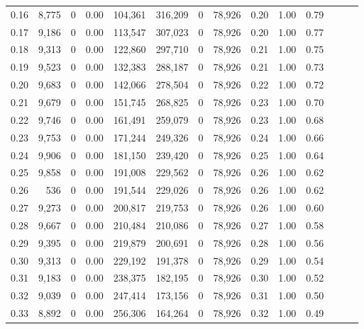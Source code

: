 \begin{tabular}{rrrrrrrrrrrrrr}
0.16 &   8,775 &      0 &  0.00 &  104,361 &  316,209 &       0 &  78,926 &  0.20 &  1.00 &      0.79 \\
0.17 &   9,186 &      0 &  0.00 &  113,547 &  307,023 &       0 &  78,926 &  0.20 &  1.00 &      0.77 \\
0.18 &   9,313 &      0 &  0.00 &  122,860 &  297,710 &       0 &  78,926 &  0.21 &  1.00 &      0.75 \\
0.19 &   9,523 &      0 &  0.00 &  132,383 &  288,187 &       0 &  78,926 &  0.21 &  1.00 &      0.73 \\
0.20 &   9,683 &      0 &  0.00 &  142,066 &  278,504 &       0 &  78,926 &  0.22 &  1.00 &      0.72 \\
0.21 &   9,679 &      0 &  0.00 &  151,745 &  268,825 &       0 &  78,926 &  0.23 &  1.00 &      0.70 \\
0.22 &   9,746 &      0 &  0.00 &  161,491 &  259,079 &       0 &  78,926 &  0.23 &  1.00 &      0.68 \\
0.23 &   9,753 &      0 &  0.00 &  171,244 &  249,326 &       0 &  78,926 &  0.24 &  1.00 &      0.66 \\
0.24 &   9,906 &      0 &  0.00 &  181,150 &  239,420 &       0 &  78,926 &  0.25 &  1.00 &      0.64 \\
0.25 &   9,858 &      0 &  0.00 &  191,008 &  229,562 &       0 &  78,926 &  0.26 &  1.00 &      0.62 \\
0.26 &     536 &      0 &  0.00 &  191,544 &  229,026 &       0 &  78,926 &  0.26 &  1.00 &      0.62 \\
0.27 &   9,273 &      0 &  0.00 &  200,817 &  219,753 &       0 &  78,926 &  0.26 &  1.00 &      0.60 \\
0.28 &   9,667 &      0 &  0.00 &  210,484 &  210,086 &       0 &  78,926 &  0.27 &  1.00 &      0.58 \\
0.29 &   9,395 &      0 &  0.00 &  219,879 &  200,691 &       0 &  78,926 &  0.28 &  1.00 &      0.56 \\
0.30 &   9,313 &      0 &  0.00 &  229,192 &  191,378 &       0 &  78,926 &  0.29 &  1.00 &      0.54 \\
0.31 &   9,183 &      0 &  0.00 &  238,375 &  182,195 &       0 &  78,926 &  0.30 &  1.00 &      0.52 \\
0.32 &   9,039 &      0 &  0.00 &  247,414 &  173,156 &       0 &  78,926 &  0.31 &  1.00 &      0.50 \\
0.33 &   8,892 &      0 &  0.00 &  256,306 &  164,264 &       0 &  78,926 &  0.32 &  1.00 &      0.49 \\

\end{tabular}
